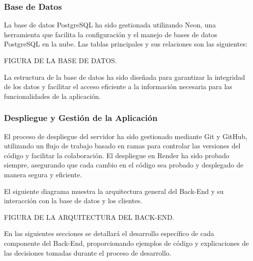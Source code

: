 \subsubsection{Base de Datos}

La base de datos PostgreSQL ha sido gestionada utilizando Neon, una herramienta que facilita la configuración y el manejo de bases de datos PostgreSQL en la nube. Las tablas principales y sus relaciones son las siguientes:

FIGURA DE LA BASE DE DATOS.

La estructura de la base de datos ha sido diseñada para garantizar la integridad de los datos y facilitar el acceso eficiente a la información necesaria para las funcionalidades de la aplicación.

\subsubsection{Despliegue y Gestión de la Aplicación}

El proceso de despliegue del servidor ha sido gestionado mediante Git y GitHub, utilizando un flujo de trabajo basado en ramas para controlar las versiones del código y facilitar la colaboración. El despliegue en Render ha sido probado siempre, asegurando que cada cambio en el código sea probado y desplegado de manera segura y eficiente.

El siguiente diagrama muestra la arquitectura general del Back-End y su interacción con la base de datos y los clientes.

FIGURA DE LA ARQUITECTURA DEL BACK-END.

En las siguientes secciones se detallará el desarrollo específico de cada componente del Back-End, proporcionando ejemplos de código y explicaciones de las decisiones tomadas durante el proceso de desarrollo.